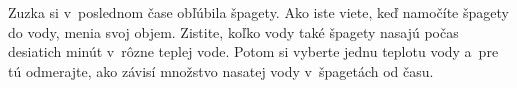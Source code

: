 Zuzka si v~poslednom čase obľúbila špagety.
Ako iste viete, keď namočíte špagety do vody, menia svoj objem.
Zistite, koľko vody také špagety nasajú počas desiatich minút v~rôzne teplej vode.
Potom si vyberte jednu teplotu vody a~pre tú odmerajte, ako závisí množstvo nasatej vody v~špagetách od času.